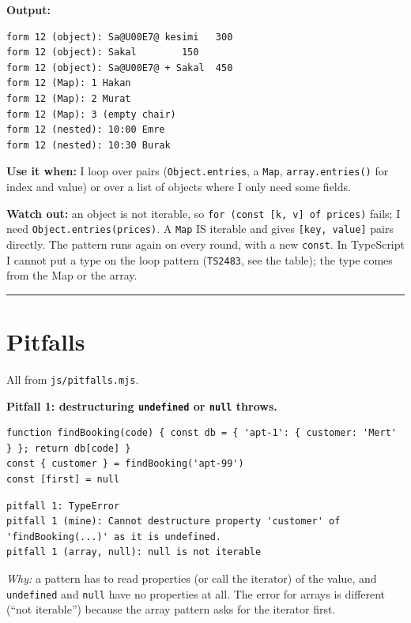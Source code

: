 \textbf{Output:}

\begin{lstlisting}
form 12 (object): Sa@U00E7@ kesimi   300
form 12 (object): Sakal        150
form 12 (object): Sa@U00E7@ + Sakal  450
form 12 (Map): 1 Hakan
form 12 (Map): 2 Murat
form 12 (Map): 3 (empty chair)
form 12 (nested): 10:00 Emre
form 12 (nested): 10:30 Burak
\end{lstlisting}

\textbf{Use it when:} I loop over pairs (\passthrough{\lstinline!Object.entries!}, a \passthrough{\lstinline!Map!}, \passthrough{\lstinline!array.entries()!} for index and value) or
over a list of objects where I only need some fields.

\textbf{Watch out:} an object is not iterable, so \passthrough{\lstinline!for (const [k, v] of prices)!} fails; I need \passthrough{\lstinline!Object.entries(prices)!}.
A \passthrough{\lstinline!Map!} IS iterable and gives \passthrough{\lstinline![key, value]!} pairs directly. The pattern runs again on every round, with a new \passthrough{\lstinline!const!}.
In TypeScript I cannot put a type on the loop pattern (\passthrough{\lstinline!TS2483!}, see the table); the type comes from the Map or the array.

\begin{center}\rule{0.5\linewidth}{0.5pt}\end{center}

\section{Pitfalls}\label{pitfalls}

All from \passthrough{\lstinline!js/pitfalls.mjs!}.

\textbf{Pitfall 1: destructuring \passthrough{\lstinline!undefined!} or \passthrough{\lstinline!null!} throws.}

\begin{lstlisting}
function findBooking(code) { const db = { 'apt-1': { customer: 'Mert' } }; return db[code] }
const { customer } = findBooking('apt-99')
const [first] = null
\end{lstlisting}

\begin{lstlisting}
pitfall 1: TypeError
pitfall 1 (mine): Cannot destructure property 'customer' of 'findBooking(...)' as it is undefined.
pitfall 1 (array, null): null is not iterable
\end{lstlisting}

\emph{Why:} a pattern has to read properties (or call the iterator) of the value, and \passthrough{\lstinline!undefined!} and \passthrough{\lstinline!null!} have no properties at all.
The error for arrays is different (``not iterable'') because the array pattern asks for the iterator first.

